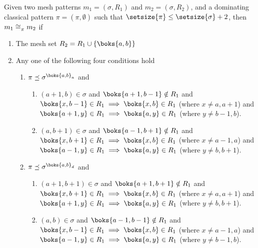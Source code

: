\begin{proposition}
    \label{prop:dom2}
    Given two mesh patterns \(m_1 =(\sigma, R_1)\) and \(m_2 = (\sigma, R_2)\),
    and a dominating classical pattern \(\pi = (\pi,\emptyset)\) such that
    \(\setsize{\pi} \le \setsize{\sigma} + 2\), then \(m_1 \cong_{\pi}^\text{} m_2 \)
    if
\begin{enumerate}
  \item The mesh set \(R_2 = R_1 \cup \{\boks{a,b}\}\)
  \item\label{prop:dom2:cond} Any one of the following four conditions hold
    \begin{enumerate}
    \item\label{prop:dom2:condc} \(\pi \preceq \sigma^{\boks{a,b}_a}\) and
      \begin{enumerate}
        \item \((a+1,b) \in \sigma\) and \(\boks{a+1,b-1}\notin R_1\) and \\
          \(\boks{x,b-1}\in R_1 \implies \boks{x,b} \in R_1 \) (where \(x\neq a,a+1\)) and\\
          \(\boks{a+1,y}\in R_1 \implies \boks{a,y} \in R_1\) (where \(y\neq b-1,b\)).
        \item \((a,b+1) \in \sigma\) and \(\boks{a-1,b+1}\notin R_1\) and \\
          \(\boks{x,b+1}\in R_1 \implies \boks{x,b} \in R_1\) (where \(x\neq a-1,a\)) and\\
          \(\boks{a-1,y}\in R_1 \implies \boks{a,y} \in R_1\) (where \(y\neq b,b+1\)).
      \end{enumerate}
    \item \(\pi \preceq \sigma^{\boks{a,b}_d}\) and
      \begin{enumerate}
        \item \((a+1,b+1) \in \sigma\) and \(\boks{a+1,b+1}\notin R_1\) and \\
          \(\boks{x,b+1}\in R_1 \implies \boks{x,b} \in R_1\) (where \(x\neq a,a+1\)) and\\
          \(\boks{a+1,y}\in R_1 \implies \boks{a,y} \in R_1\) (where \(y\neq b,b+1\)).
        \item \((a,b) \in \sigma\) and \(\boks{a-1,b-1}\notin R_1\) and \\
          \(\boks{x,b-1}\in R_1 \implies \boks{x,b} \in R_1\) (where \(x\neq a-1,a\)) and\\
          \(\boks{a-1,y}\in R_1 \implies \boks{a,y} \in R_1\)  (where \(y\neq b-1,b\)).
      \end{enumerate}
    \end{enumerate}
\end{enumerate}
\end{proposition}
